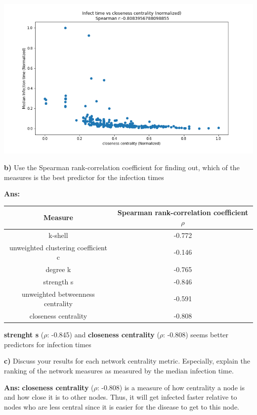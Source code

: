 \documentclass[a4paper,12pt]{article}
\begin{document}
  \begin{minipage}{0.5\textwidth}
    \includegraphics[width=\textwidth]{5}
  \end{minipage}

\clearpage
  
\textbf{b)}  Use the Spearman rank-correlation coefficient  for finding out, which of the
measures is the best predictor for the infection times

\bigskip
\textbf{Ans: }
\begin{table}[h]
  \begin{tabular}{|c|c|}
    \hline
    Measure & Spearman rank-correlation coefficient $\rho$ \\ \hline \hline
    k-shell & -0.772 \\ \hline
    unweighted clustering coefficient c & -0.146 \\ \hline
    degree k & -0.765 \\ \hline
    strength s & -0.846 \\ \hline 
    unweighted betweenness centrality & -0.591 \\ \hline
    closeness centrality & -0.808 \\ \hline
 \end{tabular}
\end{table}

\textbf{strenght s} ($\rho$: -0.845) and \textbf{closeness centrality} ($\rho$: -0.808)
seems better predictors for infection times

\bigskip
\textbf{c)} Discuss your results for each network centrality metric.
Especially, explain the ranking of the network measures as measured by the median infection
time.

\textbf{Ans:} \textbf{closeness centrality} ($\rho$: -0.808) is a measure of how centrality
a node is and how close it is to other nodes. Thus, it will get infected faster relative
to nodes who are less central since it is easier for the disease to get to this node.
\end{document}
